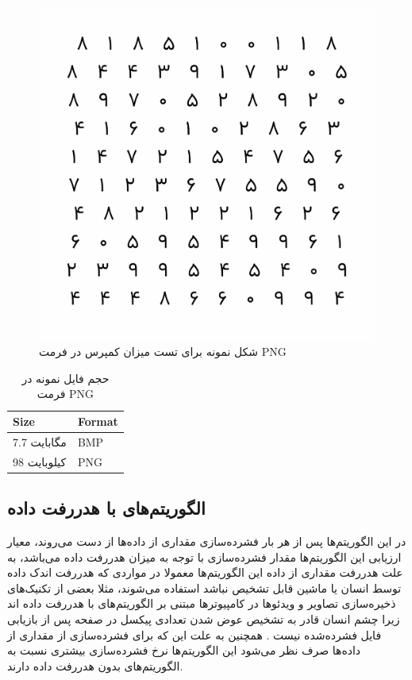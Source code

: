 \begin{figure}
	\centering
	\includegraphics[scale=0.6]{figs/compressed.png}
	\caption[شکل نمونه برای تست میزان کمپرس در فرمت PNG ]{شکل نمونه برای تست میزان کمپرس در فرمت PNG \cite{my_picture}}
	\label{example_1}
\end{figure}

\begin{table}
	\centering
	\caption{حجم فایل نمونه در فرمت PNG }
	\label{compare_1}
	\begin{tabular}{@{}ll@{}}
	\toprule
	Size & Format \\ \midrule
	7.7 مگابایت & BMP \\
	98 کیلوبایت & PNG \\ \bottomrule
	\end{tabular}
	\end{table}



\subsection{الگوریتم‌های با هدررفت داده}

در این الگوریتم‌ها پس از هر بار فشرده‌سازی مقداری از داده‌ها از دست می‌روند، معیار ارزیابی این الگوریتم‌ها 
مقدار فشرده‌سازی با توجه به میزان هدررفت داده می‌باشد، به علت هدررفت مقداری از داده این الگوریتم‌ها معمولا در 
مواردی که هدررفت اندک داده توسط انسان یا ماشین قابل تشخیص نباشد استفاده می‌شوند،‌ مثلا بعضی از تکنیک‌های 
ذخیره‌سازی تصاویر و ویدئو‌ها در کامپیوترها مبتنی بر الگوریتم‌های با هدررفت داده  
اند زیرا چشم انسان قادر به تشخیص عوض شدن تعدادی پیکسل در صفحه پس از بازیابی فایل فشرده‌شده نیست \cite{lossy_compression}
. همچنین به علت
این که برای فشرده‌سازی از مقداری از داده‌ها صرف ‌نظر می‌شود این الگوریتم‌ها نرخ فشرده‌سازی بیشتری نسبت به الگوریتم‌های بدون هدررفت داده دارند.

